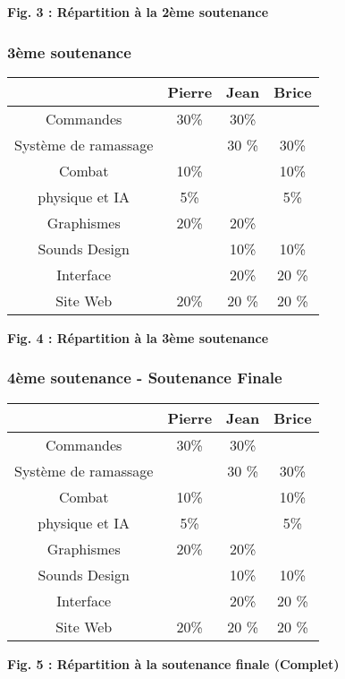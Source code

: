 \documentclass{article}
\begin{document}
\begin{center}
\bf{Fig. 3 : Répartition à la 2ème soutenance}
\end{center}



\newpage
\subsubsection{3ème soutenance}
\begin{center}
\begin{tabular}{|c|c|c|c|}
\hline
 & Pierre & Jean & Brice \\
\hline
Commandes & 30\% &30\%  & \\
\hline
Système de ramassage &  & 30 \% & 30\% \\
\hline
Combat & 10\% & & 10\% \\
\hline
 physique et IA & 5\% & & 5\%  \\
\hline
Graphismes & 20\% & 20\% & \\
\hline
Sounds Design&  & 10\% & 10\% \\
\hline
Interface & & 20\% & 20 \% \\
\hline
Site Web & 20\%& 20 \%&20 \% \\ 
\hline
\end{tabular}
\end{center}

\begin{center}
\bf{Fig. 4 : Répartition à la 3ème soutenance}
\end{center}

\subsubsection{4ème soutenance - Soutenance Finale}

\begin{center}
\begin{tabular}{|c|c|c|c|}
\hline
 & Pierre & Jean & Brice \\
\hline
Commandes & 30\% &30\%  & \\
\hline
Système de ramassage &  & 30 \% & 30\% \\
\hline
Combat & 10\% & & 10\% \\
\hline
 physique et IA & 5\% & & 5\%  \\
\hline
Graphismes & 20\% & 20\% & \\
\hline
Sounds Design&  & 10\% & 10\% \\
\hline
Interface & & 20\% & 20 \% \\
\hline
Site Web & 20\%& 20 \%&20 \% \\ 
\hline
\end{tabular}
\end{center}\begin{center}
\bf{Fig. 5 : Répartition à la soutenance finale (Complet)}
\end{center}
\end{document}
